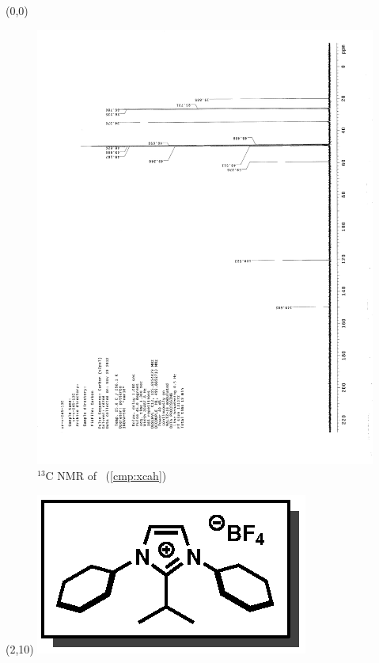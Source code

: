 \clearpage
\begin{textblock}{20}(0,0)
\begin{figure}[htb]
\caption{$^{13}$C NMR of  \CMPxcah\ (\ref{cmp:xcah})}
\includegraphics[scale=0.75, trim = 0mm 0mm 0mm 5mm,
clip]{chp_alkylation/images/nmr/xcahC}
\vspace{-100pt}
\end{figure}
\end{textblock}
\begin{textblock}{1}(2,10)
\includegraphics[scale=0.8, angle=90]{chp_alkylation/images/xcah}
\end{textblock}
\clearpage

